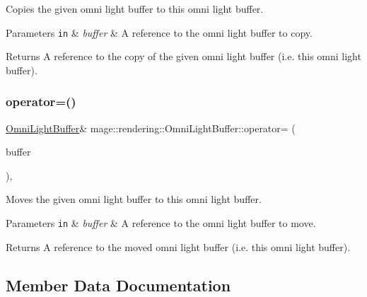 Copies the given omni light buffer to this omni light buffer.


\begin{DoxyParams}[1]{Parameters}
\mbox{\tt in}  & {\em buffer} & A reference to the omni light buffer to copy. \\
\hline
\end{DoxyParams}
\begin{DoxyReturn}{Returns}
A reference to the copy of the given omni light buffer (i.\+e. this omni light buffer). 
\end{DoxyReturn}
\mbox{\label{structmage_1_1rendering_1_1_omni_light_buffer_a5dc568c33ce2343aaf76c82aaaffa921}} 
\subsubsection{\texorpdfstring{operator=()}{operator=()}\hspace{0.1cm}{\footnotesize\ttfamily [2/2]}}
{\footnotesize\ttfamily \mbox{\hyperlink{structmage_1_1rendering_1_1_omni_light_buffer}{Omni\+Light\+Buffer}}\& mage\+::rendering\+::\+Omni\+Light\+Buffer\+::operator= (\begin{DoxyParamCaption}\item[{\mbox{\hyperlink{structmage_1_1rendering_1_1_omni_light_buffer}{Omni\+Light\+Buffer}} \&\&}]{buffer }\end{DoxyParamCaption})\hspace{0.3cm}{\ttfamily [default]}, {\ttfamily [noexcept]}}

Moves the given omni light buffer to this omni light buffer.


\begin{DoxyParams}[1]{Parameters}
\mbox{\tt in}  & {\em buffer} & A reference to the omni light buffer to move. \\
\hline
\end{DoxyParams}
\begin{DoxyReturn}{Returns}
A reference to the moved omni light buffer (i.\+e. this omni light buffer). 
\end{DoxyReturn}


\subsection{Member Data Documentation}
\mbox{\label{structmage_1_1rendering_1_1_omni_light_buffer_a01b8cc152dd0ea2b961448ad3057a5d0}} 
